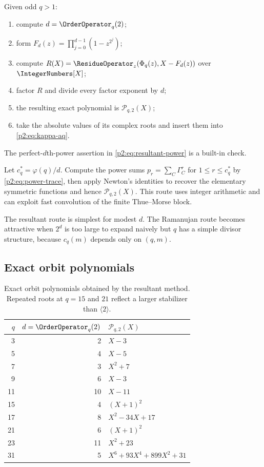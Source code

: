 \documentclass[11pt,oneside]{article}
\theoremstyle{definition}
\theoremstyle{remark}
\begin{document}
\begin{algorithm}\label{p2:alg:resultant}
Given odd $q>1$:
\begin{enumerate}
 \item compute $d=\OrderOperator_q(2)$;
 \item form $F_d(z)=\prod_{j=0}^{d-1}(1-z^{2^j})$;
 \item compute $R(X)=\ResidueOperator_z(\Phi_q(z),X-F_d(z))$ over $\IntegerNumbers[X]$;
 \item factor $R$ and divide every factor exponent by $d$;
 \item the resulting exact polynomial is $\mathscr P_{q,2}(X)$;
 \item take the absolute values of its complex roots and insert them into
 \eqref{p2:eq:kappa-aq}.
\end{enumerate}
The perfect-$d$th-power assertion in \eqref{p2:eq:resultant-power} is a built-in check.
\end{algorithm}

\begin{algorithm}\label{p2:alg:ramanujan}
Let $c_q^*=\varphi(q)/d$. Compute the power sums
$p_r=\sum_C\Gamma_C^r$ for $1\le r\le c_q^*$ by \eqref{p2:eq:power-trace}, then apply
Newton's identities to recover the elementary symmetric functions and hence
$\mathscr P_{q,2}(X)$. This route uses integer arithmetic and can exploit fast
convolution of the finite Thue--Morse block.
\end{algorithm}

The resultant route is simplest for modest $d$. The Ramanujan route becomes
attractive when $2^d$ is too large to expand naively but $q$ has a simple divisor
structure, because $c_q(m)$ depends only on $(q,m)$.

\subsection{Exact orbit polynomials}

\begin{table}[ht]
\centering\small
\begin{tabularx}{\textwidth}{@{}r r X@{}}
\toprule
$q$ & $d=\OrderOperator_q(2)$ & $\mathscr P_{q,2}(X)$ \\
\midrule
3  & 2  & $X-3$ \\
5  & 4  & $X-5$ \\
7  & 3  & $X^2+7$ \\
9  & 6  & $X-3$ \\
11 & 10 & $X-11$ \\
15 & 4  & $(X+1)^2$ \\
17 & 8  & $X^2-34X+17$ \\
21 & 6  & $(X+1)^2$ \\
23 & 11 & $X^2+23$ \\
31 & 5  & $X^6+93X^4+899X^2+31$ \\
\bottomrule
\end{tabularx}
\caption{Exact orbit polynomials obtained by the resultant method. Repeated roots
at $q=15$ and $21$ reflect a larger stabilizer than $\langle2\rangle$.}
\label{p2:tab:orbit-polynomials}
\end{table}
\end{document}
